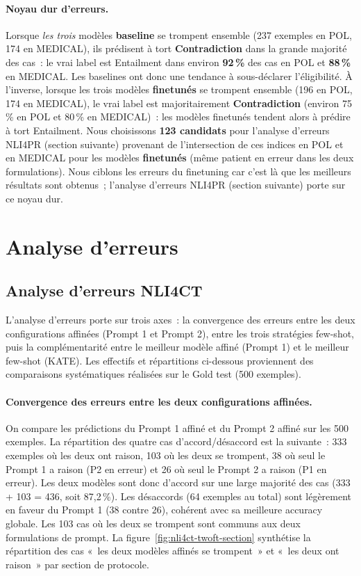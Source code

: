 \documentclass[10pt,twoside]{article}
\begin{document}
\paragraph{Noyau dur d'erreurs.}
Lorsque \emph{les trois} modèles \textbf{baseline} se trompent ensemble (237 exemples en POL, 174 en MEDICAL), ils prédisent à tort \textbf{Contradiction} dans la grande majorité des cas~: le vrai label est Entailment dans environ \textbf{92\,\%} des cas en POL et \textbf{88\,\%} en MEDICAL. Les baselines ont donc une tendance à sous-déclarer l'éligibilité. À l'inverse, lorsque les trois modèles \textbf{finetunés} se trompent ensemble (196 en POL, 174 en MEDICAL), le vrai label est majoritairement \textbf{Contradiction} (environ 75\,\% en POL et 80\,\% en MEDICAL)~: les modèles finetunés tendent alors à prédire à tort Entailment. Nous choisissons \textbf{123 candidats} pour l'analyse d'erreurs NLI4PR (section suivante) provenant de l'intersection de ces indices en POL et en MEDICAL pour les modèles \textbf{finetunés} (même patient en erreur dans les deux formulations). Nous ciblons les erreurs du finetuning car c'est là que les meilleurs résultats sont obtenus~; l'analyse d'erreurs NLI4PR (section suivante) porte sur ce noyau dur.

\section{Analyse d'erreurs}

\subsection{Analyse d'erreurs NLI4CT}
L'analyse d'erreurs porte sur trois axes~: la convergence des erreurs entre les deux configurations affinées (Prompt 1 et Prompt 2), entre les trois stratégies few-shot, puis la complémentarité entre le meilleur modèle affiné (Prompt 1) et le meilleur few-shot (KATE). Les effectifs et répartitions ci-dessous proviennent des comparaisons systématiques réalisées sur le Gold test (500 exemples).

\paragraph{Convergence des erreurs entre les deux configurations affinées.}
On compare les prédictions du Prompt 1 affiné et du Prompt 2 affiné sur les 500 exemples. La répartition des quatre cas d'accord/désaccord est la suivante~: 333 exemples où les deux ont raison, 103 où les deux se trompent, 38 où seul le Prompt 1 a raison (P2 en erreur) et 26 où seul le Prompt 2 a raison (P1 en erreur). Les deux modèles sont donc d'accord sur une large majorité des cas (333 + 103 = 436, soit 87,2\,\%). Les désaccords (64 exemples au total) sont légèrement en faveur du Prompt 1 (38 contre 26), cohérent avec sa meilleure accuracy globale. Les 103 cas où les deux se trompent sont communs aux deux formulations de prompt. La figure~\ref{fig:nli4ct-twoft-section} synthétise la répartition des cas «~les deux modèles affinés se trompent~» et «~les deux ont raison~» par section de protocole.
\end{document}
